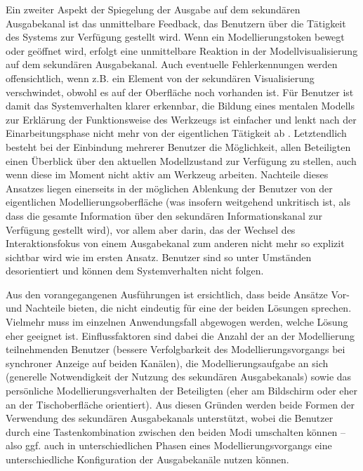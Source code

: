 Ein zweiter Aspekt der Spiegelung der Ausgabe auf dem sekundären Ausgabekanal ist das unmittelbare Feedback, das Benutzern über die Tätigkeit des Systems zur Verfügung gestellt wird. Wenn ein Modellierungstoken bewegt oder geöffnet wird, erfolgt eine unmittelbare Reaktion in der Modellvisualisierung auf dem sekundären Ausgabekanal. Auch eventuelle Fehlerkennungen werden offensichtlich, wenn z.B. ein Element von der sekundären Visualisierung verschwindet, obwohl es auf der Oberfläche noch vorhanden ist. Für Benutzer ist damit das Systemverhalten klarer erkennbar, die Bildung eines mentalen Modells zur Erklärung der Funktionsweise des Werkzeugs ist einfacher und lenkt nach der Einarbeitungsphase nicht mehr von der eigentlichen Tätigkeit ab \citep{Norman83a}. Letztendlich besteht bei der Einbindung mehrerer Benutzer die Möglichkeit, allen Beteiligten einen Überblick über den aktuellen Modellzustand zur Verfügung zu stellen, auch wenn diese im Moment nicht aktiv am Werkzeug arbeiten. Nachteile dieses Ansatzes liegen einerseits in der möglichen Ablenkung der Benutzer von der eigentlichen Modellierungsoberfläche (was insofern weitgehend unkritisch ist, als dass die gesamte Information über den sekundären Informationskanal zur Verfügung gestellt wird), vor allem aber darin, das der Wechsel des Interaktionsfokus von einem Ausgabekanal zum anderen nicht mehr so explizit sichtbar wird wie im ersten Ansatz. Benutzer sind so unter Umständen desorientiert und können dem Systemverhalten nicht folgen.

Aus den vorangegangenen Ausführungen ist ersichtlich, dass beide Ansätze Vor- und Nachteile bieten, die nicht eindeutig für eine der beiden Lösungen sprechen. Vielmehr muss im einzelnen Anwendungsfall abgewogen werden, welche Lösung eher geeignet ist. Einflussfaktoren sind dabei die Anzahl der an der Modellierung teilnehmenden Benutzer (bessere Verfolgbarkeit des Modellierungsvorgangs bei synchroner Anzeige auf beiden Kanälen), die Modellierungsaufgabe an sich (generelle Notwendigkeit der Nutzung des sekundären Ausgabekanals) sowie das persönliche Modellierungsverhalten der Beteiligten (eher am Bildschirm oder eher an der Tischoberfläche orientiert). Aus diesen Gründen werden beide Formen der Verwendung des sekundären Ausgabekanals unterstützt, wobei die Benutzer durch eine Tastenkombination zwischen den beiden Modi umschalten können -- also ggf. auch in unterschiedlichen Phasen eines Modellierungsvorgangs eine unterschiedliche Konfiguration der Ausgabekanäle nutzen können.


